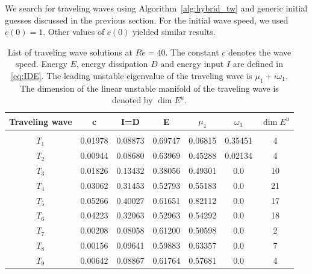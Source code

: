 \documentclass{article}
\begin{document}
We search for traveling waves using Algorithm~\ref{alg:hybrid_tw} and generic
initial guesses discussed in the previous section. For the initial
wave speed, we used $c(0)=1$. Other values of $c(0)$ yielded similar results.
%
\begin{table}
\centering
\begin{tabular}{c c c c c c c}
Traveling wave & c &  I=D & E & $\mu_1$ & $\omega_1$ &  $\dim E^u$ \\
\hline\\
$T_1$ & 0.01978 & 0.08873 & 0.69747 & 0.06815 & 0.35451 & 4 \\
$T_2$ & 0.00944 & 0.08680 & 0.63969 & 0.45288 & 0.02134 & 4 \\
$T_3$ & 0.01826 & 0.13432 & 0.38056 & 0.49301 & 0.0 & 10 \\
$T_4$ & 0.03062 & 0.31453 & 0.52793 & 0.55183 & 0.0 & 21 \\
$T_5$ & 0.05266 & 0.40027 & 0.61651 & 0.82112 & 0.0 & 17 \\
$T_6$ & 0.04223 & 0.32063 & 0.52963 & 0.54292 & 0.0 & 18 \\
$T_7$ & 0.00208 & 0.08058 & 0.61200 & 0.50598 & 0.0 & 2 \\
$T_8$ & 0.00156 & 0.09641 & 0.59883 & 0.63357 & 0.0 & 7 \\
$T_9$ & 0.00642 & 0.08867 & 0.61764 & 0.57681 & 0.0 & 4 \\
\end{tabular}
\caption{List of traveling wave solutions at $Re=40$. The constant $c$ denotes the
wave speed. Energy $E$, energy dissipation $D$ and energy input $I$ are
defined in \eqref{eq:IDE}. The leading unstable
eigenvalue of the traveling wave is $\mu_1+i\omega_1$.
The dimension of the linear unstable manifold of
the traveling wave is denoted by $\dim E^u$.}
\label{tab:TW}
\end{table}
%
\end{document}
